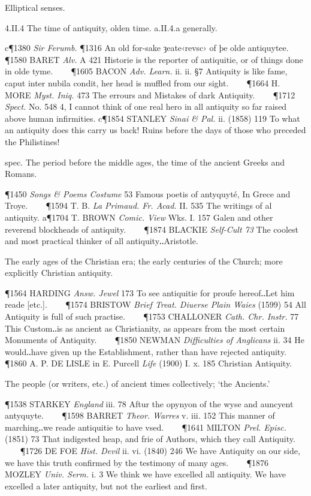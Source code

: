 \begin{description}[wide, labelwidth=!, labelindent=0pt]
\begin{myenumerate}
 Elliptical senses.

4.II.4 The time of antiquity, olden time. a.II.4.a generally.

c\P 1380 \textit{Sir Ferumb.} \P 1316 An old  for-sake ȝeate‹revsc› of þe olde antiquytee.    
\P 1580 BARET  \textit{Alv.} A 421 Historie is the reporter of antiquitie, or of things done in olde tyme.    
\P 1605 BACON  \textit{Adv. Learn.} ii. ii. §7 Antiquity is like fame, caput inter nubila condit, her head is muffled from our sight.    
\P 1664 H. MORE  \textit{Myst. Iniq.} 473 The errours and Mistakes of dark Antiquity.    
\P 1712 \textit{Spect.} No. 548 4, I cannot think of one real hero in all antiquity so far raised above human infirmities.
c\P 1854 STANLEY  \textit{Sinai \& Pal.} ii. (1858) 119 To what an antiquity does this carry us back! Ruins before the days of those who preceded the Philistines!

 spec. The period before the middle ages, the time of the ancient Greeks and Romans.

\P 1450 \textit{Songs  \& Poems Costume} 53 Famous poetis of antyquyté, In Grece and Troye.    
\P 1594 T. B. \textit{La Primaud. Fr. Acad.} II. 535 The writings of al antiquity.
a\P 1704 T. BROWN  \textit{Comic. View} Wks. I. 157 Galen and other reverend blockheads of antiquity.    
\P 1874 BLACKIE  \textit{Self-Cult 73} The coolest and most practical thinker of all antiquity‥Aristotle.

 The early ages of the Christian era; the early centuries of the Church; more explicitly Christian antiquity.

\P 1564 HARDING  \textit{Answ. Jewel} 173 To see antiquitie for proufe hereof‥Let him reade [etc.].    
\P 1574 BRISTOW  \textit{Brief Treat. Diuerse Plain Waies} (1599) 54 All Antiquity is full of such practise.    
\P 1753 CHALLONER  \textit{Cath. Chr. Instr.} 77 This Custom‥is as ancient as Christianity, as appears from the most certain Monuments of Antiquity.    
\P 1850 NEWMAN  \textit{Difficulties of Anglicans} ii. 34 He would‥have given up the Establishment, rather than have rejected antiquity.    
\P 1860 A. P. DE  LISLE in E. Purcell \textit{Life} (1900) I. x. 185 Christian Antiquity.

 The people (or writers, etc.) of ancient times collectively; ‘the Ancients.’

\P 1538 STARKEY  \textit{England} iii. 78 Aftur the opynyon of the wyse and auncyent antyquyte.    
\P 1598 BARRET  \textit{Theor. Warres} v. iii. 152 This manner of marching‥we reade antiquitie to have vsed.    
\P 1641 MILTON  \textit{Prel. Episc.} (1851) 73 That indigested heap, and frie of Authors, which they call Antiquity.    
\P 1726 DE FOE  \textit{Hist. Devil} ii. vi. (1840) 246 We have Antiquity on our side, we have this truth confirmed by the testimony of many ages.    
\P 1876 MOZLEY  \textit{Univ. Serm.} i. 3 We think we have excelled all antiquity. We have excelled a later antiquity, but not the earliest and first.


\end{myenumerate}
\end{description}
